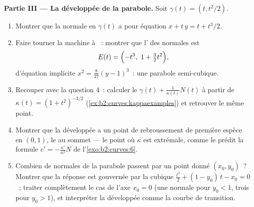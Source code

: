 \begin{problem}
\medskip
\noindent\textbf{Partie III --- La développée de la parabole.}
Soit $\gamma(t) = (t, t^2/2)$.
\begin{enumerate}[resume]
  \item Montrer que la normale en $\gamma(t)$ a pour équation
        $x + t\,y = t + t^3/2$.
  \item Faire tourner la machine à ~: montrer que
        l' des normales est
        \[
        E(t) = \Bigl(-t^3,\ 1 + \tfrac32 t^2\Bigr),
        \]
        d'équation implicite $x^2 = \tfrac8{27}(y - 1)^3$~:
        une parabole semi-cubique.
  \item Recouper avec la question 4~: calculer le  $\gamma(t) + \frac1{\kappa(t)}N(t)$ à partir de
        $\kappa(t) = (1 + t^2)^{-3/2}$
        (\cref{ex:b2:curves:kappaexamples}) et retrouver le
        même point.
  \item Montrer que la développée a un point de rebroussement de
        première espèce en
        $(0, 1)$, le  au sommet ---
        le point où $\kappa$ est extrémale, comme le prédit
        la formule $c' = -\frac{\kappa'}{\kappa^2}N$ de
        l'\cref{exo:b2:curves:6}.
  \item Combien de normales de la parabole passent par un
        point donné $(x_0, y_0)$~? Montrer que la réponse est
        gouvernée par la cubique $\tfrac{t^3}2 + (1 - y_0)\,t - x_0 = 0$~;
        traiter complètement le cas de l'axe $x_0 = 0$ (une
        normale pour $y_0 < 1$, trois pour $y_0 > 1$), et
        interpréter la développée comme
        la courbe de transition.
\end{enumerate}


\end{problem}
